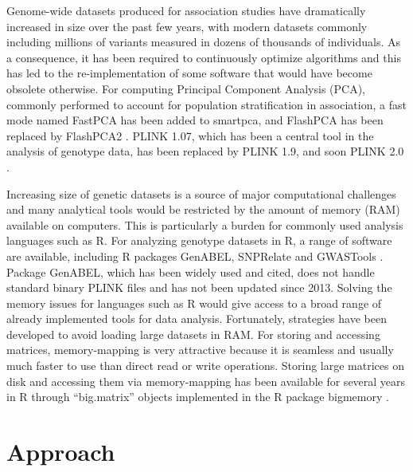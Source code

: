 \documentclass{bioinfo}
\begin{document}
{\color{red}
Genome-wide datasets produced for association studies have dramatically increased in size over the past few years, with modern datasets commonly including millions of variants measured in dozens of thousands of individuals.
As a consequence, it has been required to continuously optimize algorithms and this has led to the re-implementation of some software that would have become obsolete otherwise. For computing Principal Component Analysis (PCA), commonly performed to account for population stratification in association, a fast mode named FastPCA has been added to smartpca, and FlashPCA has been replaced by FlashPCA2 \cite[]{Abraham2014a,Abraham2016a,Galinsky2016,Price2006}. 
PLINK 1.07, which has been a central tool in the analysis of genotype data, has been replaced by PLINK 1.9, and soon PLINK 2.0 \cite[]{chang2015second,Purcell2007}. 

Increasing size of genetic datasets is a source of major computational challenges and many analytical tools would be restricted by the amount of memory (RAM) available on computers.
This is particularly a burden for commonly used analysis languages such as R.
For analyzing genotype datasets in R, a range of software are available, including R packages GenABEL, SNPRelate and GWASTools \cite[]{aulchenko2007genabel,Gogarten2012,zheng2012high}. Package GenABEL, which has been widely used and cited, does not handle standard binary PLINK files and has not been updated since 2013.
Solving the memory issues for languages such as R would give access to a broad range of already implemented tools for data analysis. Fortunately, strategies have been developed to avoid loading large datasets in RAM. For storing and accessing matrices, memory-mapping is very attractive because it is seamless and usually much faster to use than direct read or write operations. Storing large matrices on disk and accessing them via memory-mapping has been available for several years in R through ``big.matrix'' objects implemented in the R package bigmemory \cite[]{Kane2013}.
}

\section{Approach}
\end{document}
